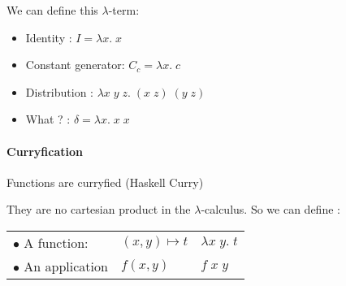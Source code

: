   \exam We can define this $\lambda$-term:

  \begin{itemize}
    \item Identity : $I = \lambda x.\; x$
    \item Constant generator: $C_c = \lambda x.\; c$
    \item Distribution : $\lambda x\; y\; z.\; (x\;z)\; (y\;z)$
    \item What ? : $\delta = \lambda x.\;x\;x$
  \end{itemize}


  \paragraph{Curryfication} Functions are curryfied (Haskell Curry)

  They are no cartesian product in the $\lambda$-calculus. So we can define :

  \begin{center}
  \begin{tabular}{l l l}
    $\bullet$ A function: & $(x, y)\mapsto t$ & $\lambda x\;y.\; t$ \\
    $\bullet$ An application & $f(x, y)$ & $f\; x\; y$
  \end{tabular}
  \end{center}
